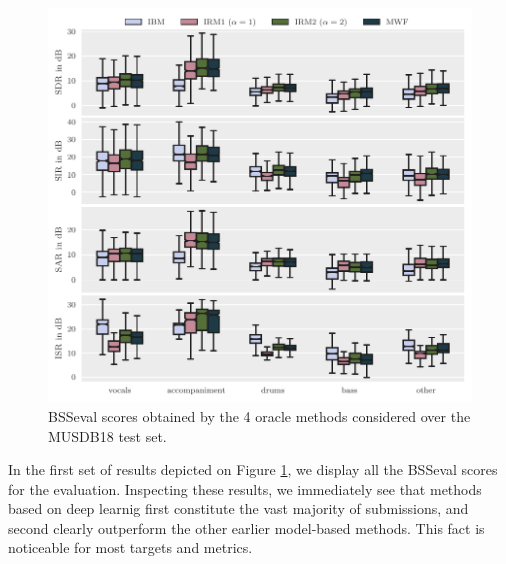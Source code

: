 \documentclass{llncs}
\begin{document}
\begin{figure}[ht]
  \begin{center}
     \includegraphics[width=\linewidth]{fig/oracle-evaluation.pdf}
     \vspace{-1cm}
  \end{center}
  \caption{BSSeval scores obtained by the 4 oracle methods considered over the MUSDB18 test set.}
  \label{fig:boxplots_bsseval}
\end{figure}

In the first set of results depicted on Figure \ref{fig:boxplots_bsseval}, we display all the BSSeval scores for the evaluation. Inspecting these results, we immediately see that methods based on deep learnig first constitute the vast majority of submissions, and second clearly outperform the other earlier model-based methods. This fact is noticeable for most targets and metrics.
\end{document}
